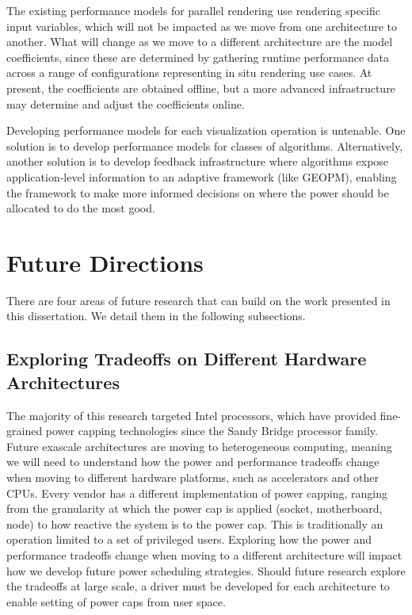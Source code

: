 The existing performance models for parallel rendering use rendering specific
input variables, which will not be impacted as we move from one architecture to
another.
%
What will change as we move to a different architecture are the model
coefficients, since these are determined by gathering runtime performance data
across a range of configurations representing in situ rendering use cases.
%
At present, the coefficients are obtained offline, but a more advanced
infrastructure may determine and adjust the coefficients online.

Developing performance models for each visualization operation is untenable.
%
One solution is to develop performance models for classes of algorithms.
%
Alternatively, another solution is to develop feedback infrastructure where
algorithms expose application-level information to an adaptive framework (like
GEOPM), enabling the framework to make more informed decisions on where the
power should be allocated to do the most good.

\section{Future Directions}
There are four areas of future research that can build on the work presented
in this dissertation.
%
We detail them in the following subsections.

\subsection{Exploring Tradeoffs on Different Hardware Architectures}

The majority of this research targeted Intel processors, which have provided
fine-grained power capping technologies since the Sandy Bridge processor
family.
%
Future exascale architectures are moving to heterogeneous computing, meaning we
will need to understand how the power and performance tradeoffs change when
moving to different hardware platforms, such as accelerators and other CPUs.
%
Every vendor has a different implementation of power capping, ranging from the
granularity at which the power cap is applied (\eg socket, motherboard, node)
to how reactive the system is to the power cap.
%
This is traditionally an operation limited to a set of privileged users.
%
Exploring how the power and performance tradeoffs change when moving to a
different architecture will impact how we develop future power scheduling
strategies.
%
Should future research explore the tradeoffs at large scale, a driver must be
developed for each architecture to enable setting of power caps from user
space.

